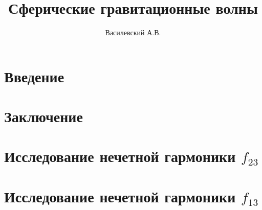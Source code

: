 \documentclass[12pt,a4paper]{article}
\title{Сферические гравитационные волны}
\author{Василевский А.В.}
\begin{document}
    \makedocroot

    \maketitle
    \tableofcontents

    \section{Введение}
    

    \section{Заключение}
    

    \begin{appendix}

        \section{Исследование нечетной гармоники $f_{23}$}
        

        \section{Исследование нечетной гармоники $f_{13}$}
        

    \end{appendix}
\end{document}
